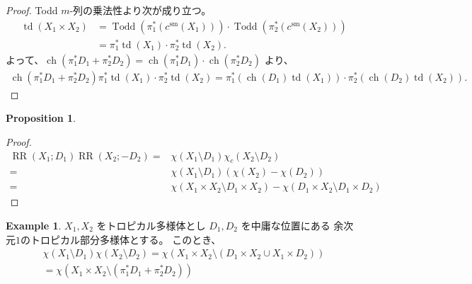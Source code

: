 \documentclass[a4paper,dvipdfmx,reqno,12pt]{amsart}
\theoremstyle{definition}
\newtheorem{example}[theorem]{Example}
\newtheorem{proposition}[theorem]{Proposition}
\newcommand{\opn}[1]{\operatorname{#1}}
\numberwithin{equation}{section}
\begin{document}
\begin{proof}
Todd $m$-列の乗法性より次が成り立つ。
\begin{align}
\opn{td}(X_1\times X_2)
&=\opn{Todd}(\pi^{*}_1(c^{\mathrm{sm}}(X_1)))
\cdot \opn{Todd}(\pi^{*}_2(c^{\mathrm{sm}}(X_2))) \\
&=\pi^{*}_1\opn{td}(X_1)\cdot 
\pi^{*}_2\opn{td}(X_2).
\end{align}
よって、$\opn{ch}(\pi_1^{*}D_1+\pi_2^{*}D_2)=
\opn{ch}(\pi_1^{*}D_1)\cdot \opn{ch}(\pi_2^{*}D_2)$
より、
\begin{align}
\opn{ch}(\pi_1^{*}D_1+\pi_2^{*}D_2)
\pi^{*}_1\opn{td}(X_1)\cdot 
\pi^{*}_2\opn{td}(X_2)=
\pi_1^{*}(\opn{ch}(D_1)\opn{td}(X_1))\cdot
\pi_2^{*}(\opn{ch}(D_2)\opn{td}(X_2)).
\end{align}

\end{proof}

\begin{proposition}

\end{proposition}
\begin{proof}

\begin{align}
\opn{RR}(X_1;D_1)
\opn{RR}(X_2;-D_2)
= &\chi(X_1\setminus D_1)\chi_c(X_2\setminus D_2) \\
= &\chi(X_1\setminus D_1)
(\chi(X_2)-\chi(D_2)) \\
= &\chi(X_1\times X_2\setminus D_1\times X_2)
-\chi(D_1\times X_2\setminus D_1\times D_2)
\end{align}

\end{proof}




\begin{example}
$X_1,X_2$ をトロピカル多様体とし 
$D_1,D_2$ を中庸な位置にある
余次元$1$のトロピカル部分多様体とする。
このとき、
\begin{align}
\chi(X_1\setminus D_1)\chi(X_2\setminus D_2)
=\chi(X_1\times X_2 \setminus (D_1\times X_2\cup X_1\times D_2)) \\
=\chi(X_1\times X_2 \setminus (\pi_1^{*}D_1+\pi_2^{*}D_2))
\end{align}

\end{example}



\end{document}

